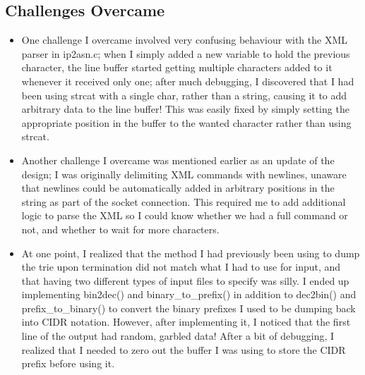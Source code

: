 \documentclass[letterpaper,10pt,fleqn]{article}
\numberwithin{equation}{section}
\begin{document}
\subsection*{Challenges Overcame}
\begin{itemize}
    \item One challenge I overcame involved very confusing behaviour with the XML parser in ip2asn.c; when I simply added a new variable to hold the previous character, the line buffer started getting multiple characters added to it whenever it received only one; after much debugging, I discovered that I had been using strcat with a single char, rather than a string, causing it to add arbitrary data to the line buffer!  This was easily fixed by simply setting the appropriate position in the buffer to the wanted character rather than using strcat.
    \item Another challenge I overcame was mentioned earlier as an update of the design; I was originally delimiting XML commands with newlines, unaware that newlines could be automatically added in arbitrary positions in the string as part of the socket connection.  This required me to add additional logic to parse the XML so I could know whether we had a full command or not, and whether to wait for more characters.
    \item At one point, I realized that the method I had previously been using to dump the trie upon termination did not match what I had to use for input, and that having two different types of input files to specify was silly.  I ended up implementing bin2dec() and binary\_to\_prefix() in addition to dec2bin() and prefix\_to\_binary() to convert the binary prefixes I used to be dumping back into CIDR notation.  However, after implementing it, I noticed that the first line of the output had random, garbled data!  After a bit of debugging, I realized that I needed to zero out the buffer I was using to store the CIDR prefix before using it.
\end{itemize}
\end{document}
